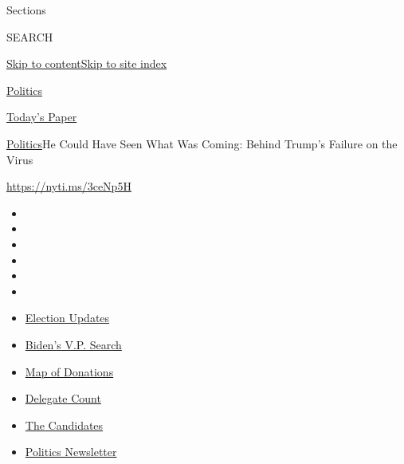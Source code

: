 Sections

SEARCH

\protect\hyperlink{site-content}{Skip to
content}\protect\hyperlink{site-index}{Skip to site index}

\href{https://www.nytimes3xbfgragh.onion/section/politics}{Politics}

\href{https://myaccount.nytimes3xbfgragh.onion/auth/login?response_type=cookie\&client_id=vi}{}

\href{https://www.nytimes3xbfgragh.onion/section/todayspaper}{Today's
Paper}

\href{/section/politics}{Politics}\textbar{}He Could Have Seen What Was
Coming: Behind Trump's Failure on the Virus

\url{https://nyti.ms/3ceNp5H}

\begin{itemize}
\item
\item
\item
\item
\item
\item
\end{itemize}

\begin{itemize}
\item
  \href{https://www.nytimes3xbfgragh.onion/2020/08/04/us/elections/primary-election-michigan-arizona-kansas.html?action=click\&pgtype=Article\&state=default\&region=TOP_BANNER\&context=storylines_menu}{Election
  Updates}
\item
  \href{https://www.nytimes3xbfgragh.onion/article/biden-vice-president-2020.html?action=click\&pgtype=Article\&state=default\&region=TOP_BANNER\&context=storylines_menu}{Biden's
  V.P. Search}
\item
  \href{https://www.nytimes3xbfgragh.onion/interactive/2020/07/24/us/politics/trump-biden-campaign-donors.html?action=click\&pgtype=Article\&state=default\&region=TOP_BANNER\&context=storylines_menu}{Map
  of Donations}
\item
  \href{https://www.nytimes3xbfgragh.onion/interactive/2020/us/elections/delegate-count-primary-results.html?action=click\&pgtype=Article\&state=default\&region=TOP_BANNER\&context=storylines_menu}{Delegate
  Count}
\item
  \href{https://www.nytimes3xbfgragh.onion/interactive/2019/us/politics/2020-presidential-candidates.html?action=click\&pgtype=Article\&state=default\&region=TOP_BANNER\&context=storylines_menu}{The
  Candidates}
\item
  \href{https://www.nytimes3xbfgragh.onion/newsletters/politics?action=click\&pgtype=Article\&state=default\&region=TOP_BANNER\&context=storylines_menu}{Politics
  Newsletter}
\end{itemize}


